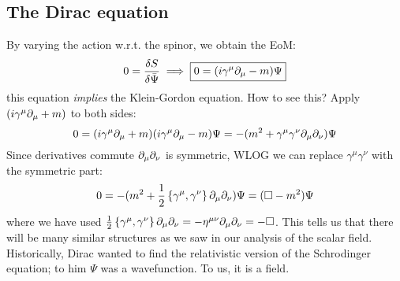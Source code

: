 \subsection{The Dirac equation}
By varying the action w.r.t. the spinor, we obtain the EoM:
\begin{equation}
    0 = \frac{\delta S}{\delta \bar{\Psi}} \implies \boxed{0 = (i\gamma^\mu\partial_\mu - m)\Psi}
\end{equation}
this equation \emph{implies} the Klein-Gordon equation. How to see this? Apply $(i\gamma^\mu\partial_\mu + m)$ to both sides:
\begin{equation}
    0 = (i\gamma^\mu\partial_\mu + m)(i\gamma^\mu\partial_\mu - m)\Psi = -(m^2 + \gamma^\mu\gamma^\nu \partial_\mu \partial_\nu)\Psi
\end{equation}
Since derivatives commute $\partial_\mu\partial_\nu$ is symmetric, WLOG we can replace $\gamma^\mu\gamma^\nu$ with the symmetric part:
\begin{equation}
    0 = -(m^2 + \frac{1}{2}\set{\gamma^\mu, \gamma^\nu}\partial_\mu\partial_\nu)\Psi = (\square - m^2)\Psi
\end{equation}
where we have used $\frac{1}{2}\set{\gamma^\mu, \gamma^\nu}\partial_\mu\partial_\nu = -\eta^{\mu\nu}\partial_\mu\partial_\nu = -\square$. This tells us that there will be many similar structures as we saw in our analysis of the scalar field. Historically, Dirac wanted to find the relativistic version of the Schrodinger equation; to him $\Psi$ was a wavefunction. To us, it is a field.


